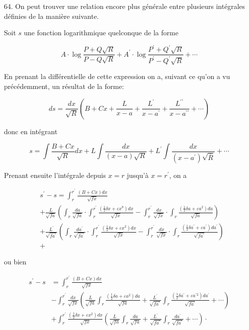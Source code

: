 \documentclass{article}
\begin{document}
64. On peut trouver une relation encore plus générale entre plusieurs intégrales définies de la manière suivante.

Soit \(s\) une fonction logarithmique quelconque de la forme

\[
A \cdot \log \frac{P+Q \sqrt{R}}{P-Q \sqrt{R}}+A^{\prime} \cdot \log \frac{P^{\prime}+Q^{\prime} \sqrt{R}}{P^{\prime}-Q^{\prime} \sqrt{R}}+\cdots
\]

En prenant la différentielle de cette expression on a, suivant ce qu'on a vu précédemment, un résultat de la forme:

\[
d s=\frac{d x}{\sqrt{R}}\left(B+C x+\frac{L}{x-a}+\frac{L^{\prime}}{x-a^{\prime}}+\frac{L^{\prime \prime}}{x-a^{\prime \prime}}+\cdots\right)
\]

donc en intégrant

\[
s=\int \frac{B+C x}{\sqrt{R}} d x+L \int \frac{d x}{(x-a) \sqrt{R}}+L^{\prime} \int \frac{d x}{\left(x-a^{\prime}\right) \sqrt{\bar{R}}}+\cdots
\]

Prenant ensuite l'intégrale depuis \(x=r\) jusqu'à \(x=r^{\prime}\), on a

\[
\begin{aligned}
& s^{\prime}-s=\int_{r}^{r^{\prime}} \frac{(B+C x) d x}{\sqrt{f x}} \\
& +\frac{L}{\sqrt{f a}}\left(\int_{r} \frac{d a}{\sqrt{f a}} \cdot \int_{r}^{r^{\prime}} \frac{\left(\frac{1}{2} \delta x+\varepsilon x^{8}\right) d x}{\sqrt{f x}}-\int_{r}^{r^{\prime}} \frac{d x}{\sqrt{f x}} \cdot \int_{r} \frac{\left(\frac{1}{2} \delta a+\varepsilon a^{2}\right) d a}{\sqrt{f a}}\right) \\
& +\frac{L^{\prime}}{\sqrt{f a^{\prime}}}\left(\int_{r} \frac{d a^{\prime}}{\sqrt{f a^{\prime}}} \cdot \int_{r}^{r^{\prime}} \frac{\left(\frac{1}{2} \delta x+\varepsilon x^{2}\right) d x}{\sqrt{f x}}-\int_{r}^{r^{\prime}} \frac{d x}{\sqrt{f x}} \cdot \int_{r} \frac{\left(\frac{1}{2} \delta a^{\prime}+\varepsilon a^{\prime}\right) d a^{\prime}}{\sqrt{f a^{\prime}}}\right) \\
& +
\end{aligned}
\]

ou bien

\[
\begin{aligned}
s^{\prime}-s & =\int_{r}^{r^{\prime}} \frac{(B+C x) d x}{\sqrt{f x}} \\
& -\int_{r}^{r^{\prime}} \frac{d x}{\sqrt{f x}}\left(\frac{L}{\sqrt{f a}} \int_{r} \frac{\left(\frac{1}{2} \delta a+\varepsilon a^{2}\right) d a}{\sqrt{f a}}+\frac{L^{\prime}}{\sqrt{f a^{\prime}}} \int_{r} \frac{\left(\frac{1}{2} \delta a^{\prime}+\varepsilon a^{\prime 2}\right) d a^{\prime}}{\sqrt{f a^{\prime}}}+\cdots\right) \\
& +\int_{r}^{r^{\prime}} \frac{\left(\frac{1}{2} \delta x+\varepsilon x^{2}\right) d x}{\sqrt{f x}}\left(\frac{L}{\sqrt{f a}} \int_{r} \frac{d a}{\sqrt{f a}}+\frac{L^{\prime}}{\sqrt{f a^{\prime}}} \int_{r} \frac{d a^{\prime}}{\sqrt{f a^{\prime}}}+\cdots\right) \cdot
\end{aligned}
\]
\end{document}
